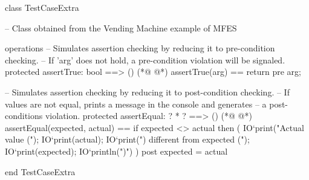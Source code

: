\begin{vdmpp}[breaklines=true]
class TestCaseExtra

 -- Class obtained from the Vending Machine example of MFES
 
 
 operations
 -- Simulates assertion checking by reducing it to pre-condition checking.
 -- If 'arg' does not hold, a pre-condition violation will be signaled.
 protected assertTrue: bool ==> ()
(*@
\label{assertTrue:10}
@*)
 assertTrue(arg) == 
  return 
 pre arg;
  
 -- Simulates assertion checking by reducing it to post-condition checking.
 -- If values are not equal, prints a message in the console and generates 
 -- a post-conditions violation.
 protected assertEqual: ? * ? ==> ()
(*@
\label{assertEqual:18}
@*)
 assertEqual(expected, actual) == 
  if expected <> actual then (
     IO`print("Actual value (");
     IO`print(actual); 
     IO`print(") different from expected (");
     IO`print(expected);
     IO`println(")\n")
  )
 post expected = actual
 
end TestCaseExtra


\end{vdmpp}
